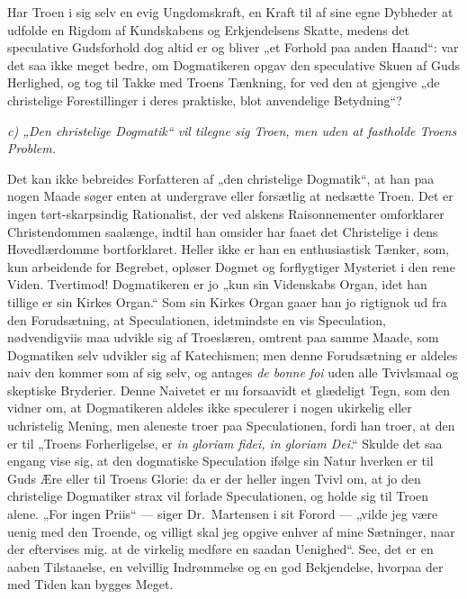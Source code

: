Har Troen i sig selv en evig Ungdomskraft, en Kraft til af sine
egne Dybheder at udfolde en Rigdom af Kundskabens og Erkjendelsens
Skatte, medens det speculative Gudsforhold dog altid er og bliver
„et Forhold paa anden Haand“: var det saa ikke meget bedre, om
Dogmatikeren opgav den speculative Skuen af Guds Herlighed, og tog
til Takke med Troens Tænkning, for ved den at gjengive „de
christelige Forestillinger i deres praktiske, blot anvendelige
Betydning“?

\begin{center}
\emph{c) „Den christelige Dogmatik“ vil tilegne sig Troen, men
uden at fastholde Troens Problem.}
\end{center}

Det kan ikke bebreides Forfatteren af „den christelige Dogmatik“,
at han paa nogen Maade søger enten at undergrave eller forsætlig
at nedsætte Troen. Det er ingen tørt-skarpsindig Rationalist, der
ved alskens Raisonnementer omforklarer Christendommen saalænge,
indtil han omsider har faaet det Christelige i dens
Hovedlærdomme bortforklaret. Heller ikke er han en enthusiastisk
Tænker, som, kun arbeidende for Begrebet, opløser Dogmet og
forflygtiger Mysteriet i den rene Viden. Tvertimod! Dogmatikeren
er jo „kun sin Videnskabs Organ, idet han tillige er sin Kirkes
Organ.“ Som sin Kirkes Organ gaaer han jo rigtignok ud fra den
Forudsætning, at Speculationen, idetmindste en vis Speculation,
nødvendigviis maa udvikle sig af Troeslæren, omtrent paa
 samme Maade, som Dogmatiken selv udvikler sig af Katechismen; men
denne Forudsætning er aldeles naiv den kommer som af sig selv, og
antages \textit{de bonne foi} uden alle Tvivlsmaal og skeptiske
Bryderier. Denne Naivetet er nu forsaavidt et glædeligt Tegn, som
den vidner om, at Dogmatikeren aldeles ikke speculerer i nogen
ukirkelig eller uchristelig Mening, men aleneste troer paa
Speculationen, fordi han troer, at den er til „Troens
Forherligelse, er \textit{in gloriam fidei, in gloriam Dei}.“
Skulde det saa engang vise sig, at den dogmatiske Speculation
ifølge sin Natur hverken er til Guds Ære eller til Troens Glorie:
da er der heller ingen Tvivl om, at jo den christelige Dogmatiker
strax vil forlade Speculationen, og holde sig til Troen alene.
„For ingen Priis“ --- siger Dr.\ Martensen i sit Forord ---
„vilde jeg være uenig med den Troende, og villigt skal jeg opgive
enhver af mine Sætninger, naar der eftervises mig. at de virkelig
medføre en saadan Uenighed“. See, det er en aaben Tilstaaelse, en
velvillig Indrømmelse og en god Bekjendelse, hvorpaa der med Tiden
kan bygges Meget.

